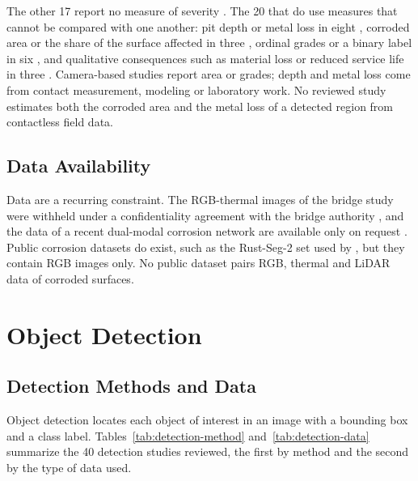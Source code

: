 The other 17 report no measure of severity
\citep{Li2022,Nash2022,Nguyen2026,Doshvarpassand2022,Lavadiya2022,Maharjan2025,Mao2026,PallasEnguita2025,Khodabux2020,Yu2023,HerndonTien2025,DeKerf2022,Liang2021,Espinoza2026,Alvani2026,Imran2025,Yao2019}.
The 20 that do use measures that cannot be compared with one another: pit depth
or metal loss in eight \citep{Liu2026,Wang2021,Qin2026,Egodawela2025,Akhlaghi2023,Huang2026a,Khodabux2021a,Yang2025}, corroded area or
the share of the surface affected in three \citep{Savino2025,Suzuki2026,Hu2023}, ordinal grades
or a binary label in six \citep{Bui2026,Hernndez-Surez2026,Rahman2021,Arias2025,Fu2024,Malashin2024}, and qualitative
consequences such as material loss or reduced service life in three
\citep{Elizalde2023,Wojciechowski2025,Yang2026a}. Camera-based studies report area or grades; depth and metal loss
come from contact measurement, modeling or laboratory work. No reviewed study
estimates both the corroded area and the metal loss of a detected region from
contactless field data.

\subsection{Data Availability}

Data are a recurring constraint. The RGB-thermal images of the bridge study were
withheld under a confidentiality agreement with the bridge authority \citep{Lim2021}, and
the data of a recent dual-modal corrosion network are available only on request
\citep{Mao2026}. Public corrosion datasets do exist, such as the Rust-Seg-2 set used by
\citet{Espinoza2026}, but they contain RGB images only. No public dataset pairs RGB, thermal
and LiDAR data of corroded surfaces.

\section{Object Detection}
\label{sec:lr-detection}

\subsection{Detection Methods and Data}

Object detection locates each object of interest in an image with a bounding box
and a class label. Tables~\ref{tab:detection-method} and~\ref{tab:detection-data}
summarize the 40 detection studies reviewed, the first by method and the second
by the type of data used.

